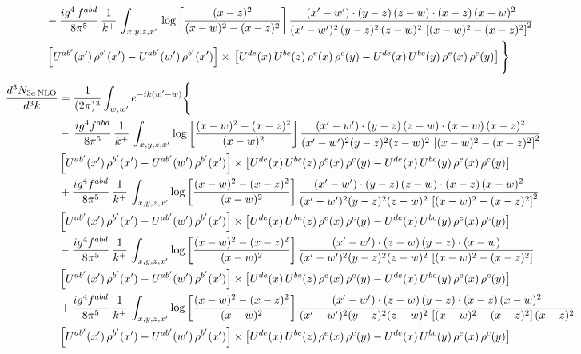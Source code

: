 \documentclass[9pt]{article}
\numberwithin{equation}{section}
\begin{document}
\begin{align}
& -\frac{ig^{4}\, f^{abd}}{8\pi^{5}}\, \frac{1}{k^{+}}\, \int_{x,y,z,x'}\,\log{\left[\frac{(x-z)^{2}}{(x-w)^{2}-(x-z)^{2}}\right]}\,\frac{(x'-w')\cdot (y-z)\, (z-w)\cdot (x-z)\,(x-w)^{2}}{(x'-w')^{2}\, (y-z)^{2}\, (z-w)^{2}\,\left[(x-w)^{2}-(x-z)^{2}\right]^{2}}\, \notag \\ & \left[U^{ab'}(x')\,\rho^{b'}(x')-U^{ab'}(w')\, \rho^{b'}(x')\right]\times\,\left[U^{de}(x)\,U^{bc}(z)\, \rho^{e}(x)\,\rho^{c}(y)-U^{de}(x)\,U^{bc}(y)\,\rho^{e}(x)\,\rho^{c}(y)\right]\Bigg\}
\end{align}
\begin{align}
\frac{d^{3}N_{3a\,\rm NLO}}{d^{3}k} & = \frac{1}{(2\pi)^{3}}\int_{w,w'}e^{-ik(w'-w)}\Bigg\{\notag \\
& -\,\frac{ig^{4}f^{abd}}{8\pi^{5}}\,\frac{1}{k^{+}}\,\int_{x,y,z,x'}\log{\left[\frac{(x-w)^{2}-(x-z)^{2}}{(x-w)^{2}}\right]}\,
\frac{(x'-w')\cdot(y-z)\,(z-w)\cdot(x-w)\,(x-z)^{2}}{(x'-w')^{2}(y-z)^{2}(z-w)^{2}\,\left[(x-w)^{2}-(x-z)^{2}\right]^{2}}\notag \\ & \left[U^{ab'}(x')\,\rho^{b'}(x')-U^{ab'}(w')\, \rho^{b'}(x')\right]\times \left[U^{de}(x)\,U^{bc}(z)\, \rho^{e}(x)\,\rho^{c}(y)-U^{de}(x)\,U^{bc}(y)\,\rho^{e}(x)\,\rho^{c}(y)\right] \notag \\
& +\frac{ig^{4}f^{abd}}{8\pi^{5}}\,\frac{1}{k^{+}}\,\int_{x,y,z,x'}\log{\left[\frac{(x-w)^{2}-(x-z)^{2}}{(x-w)^{2}}\right]}\,
\frac{(x'-w')\cdot(y-z)\,(z-w)\cdot(x-z)\,(x-w)^{2}}{(x'-w')^{2}(y-z)^{2}(z-w)^{2}\,\left[(x-w)^{2}-(x-z)^{2}\right]^{2}}\notag \\ 
&\left[U^{ab'}(x')\,\rho^{b'}(x')-U^{ab'}(w')\, \rho^{b'}(x')\right]\times \left[U^{de}(x)\,U^{bc}(z)\, \rho^{e}(x)\,\rho^{c}(y)-U^{de}(x)\,U^{bc}(y)\,\rho^{e}(x)\,\rho^{c}(y)\right] \notag \\
& -\frac{ig^{4}f^{abd}}{8\pi^{5}}\,\frac{1}{k^{+}}\,\int_{x,y,z,x'}\log{\left[\frac{(x-w)^{2}-(x-z)^{2}}{(x-w)^{2}}\right]}\,
\frac{(x'-w')\cdot(z-w)\,(y-z)\cdot(x-w)}{(x'-w')^{2}(y-z)^{2}(z-w)^{2}\,\left[(x-w)^{2}-(x-z)^{2}\right]}\notag \\ & \left[U^{ab'}(x')\,\rho^{b'}(x')-U^{ab'}(w')\, \rho^{b'}(x')\right]\times \left[U^{de}(x)\,U^{bc}(z)\, \rho^{e}(x)\,\rho^{c}(y)-U^{de}(x)\,U^{bc}(y)\,\rho^{e}(x)\,\rho^{c}(y)\right] \notag \\
&  +\frac{ig^{4}f^{abd}}{8\pi^{5}}\,\frac{1}{k^{+}}\,\int_{x,y,z,x'}\log{\left[\frac{(x-w)^{2}-(x-z)^{2}}{(x-w)^{2}}\right]}\,
\frac{(x'-w')\cdot(z-w)\,(y-z)\cdot(x-z)\,(x-w)^{2}}{(x'-w')^{2}(y-z)^{2}(z-w)^{2}\,\left[(x-w)^{2}-(x-z)^{2}\right](x-z)^{2}}\notag \\ & \left[U^{ab'}(x')\,\rho^{b'}(x')-U^{ab'}(w')\, \rho^{b'}(x')\right]\times \left[U^{de}(x)\,U^{bc}(z)\, \rho^{e}(x)\,\rho^{c}(y)-U^{de}(x)\,U^{bc}(y)\,\rho^{e}(x)\,\rho^{c}(y)\right] \notag \\

\end{align}
\end{document}
